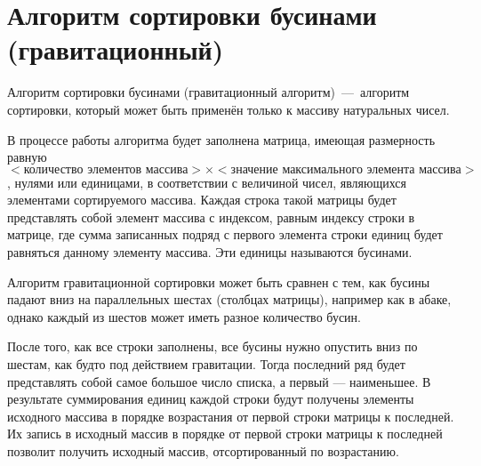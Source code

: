 \section{Алгоритм сортировки бусинами (гравитационный)}
Алгоритм сортировки бусинами (гравитационный алгоритм)~---~алгоритм сортировки, который может быть применён только к массиву натуральных чисел.

В процессе работы алгоритма будет заполнена матрица, имеющая размерность равную  $<\text{количество элементов массива}>\times<\text{значение максимального элемента массива}>$, нулями или единицами, в соответствии с величиной чисел, являющихся элементами сортируемого массива. Каждая строка такой матрицы будет представлять собой элемент массива с индексом, равным индексу строки в матрице, где сумма записанных подряд с первого элемента строки единиц будет равняться данному элементу массива. Эти единицы называются бусинами.

Алгоритм гравитационной сортировки может быть сравнен с тем, как бусины падают вниз на параллельных шестах (столбцах матрицы), например как в абаке, однако каждый из шестов может иметь разное количество бусин. 

После того, как все строки заполнены, все бусины нужно опустить вниз по шестам, как будто под действием гравитации. Тогда последний ряд будет представлять собой самое большое число списка, а первый — наименьшее. В результате суммирования единиц каждой строки будут получены элементы исходного массива в порядке возрастания от первой строки матрицы к последней. Их запись в исходный массив в порядке от первой строки матрицы к последней позволит получить исходный массив, отсортированный по возрастанию.

\newpage